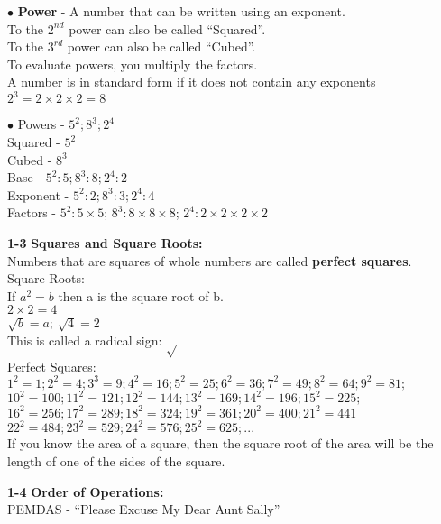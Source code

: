 \begin{enumerate*}
\begin{enumerate*}
			\item[$\bullet$]\textbf{Power} - A number that can be written using an exponent.\\
			To the $2^{nd}$ power can also be called ``Squared''.\\
			To the $3^{rd}$ power can also be called ``Cubed''.\\
			To evaluate powers, you multiply the factors.\\
			A number is in standard form if it does not contain any exponents\\
			$2^3=2\times2\times2=8$\\
			\item[$\bullet$]Powers - $5^2;8^3;2^4$\\
			Squared - $5^2$\\
			Cubed - $8^3$\\
			Base - $5^2:5;8^3:8;2^4:2$\\
			Exponent - $5^2:2;8^3:3;2^4:4$\\
			Factors - $5^2:5\times5$; $8^3:8\times8\times8$; $2^4:2\times2\times2\times2$\\
			\end{enumerate*}
			
		\item[\Large\textbf{1-3}] \Large\textbf{Squares and Square Roots:}\\
			Numbers that are squares of whole numbers are called \textbf{perfect squares}.\\
			Square Roots:\\
			If $a^2=b$ then a is the square root of b.\\
			$2\times2=4$\\
			$\sqrt{b}=a$; $\sqrt{4}=2$\\
			This is called a radical sign: $\sqrt{}$\\
			Perfect Squares:\\
			$1^2 = 1; 2^2=4; 3^3=9; 4^2=16; 5^2=25; 6^2=36; 7^2=49; 8^2=64; 9^2=81;$\\
			$10^2=100; 11^2=121; 12^2=144; 13^2=169; 14^2 = 196; 15^2=225;$\\
			$16^2=256; 17^2=289; 18^2=324; 19^2=361; 20^2=400; 21^2=441$\\
			$22^2=484; 23^2=529; 24^2=576; 25^2=625; ...$\\
			If you know the area of a square, then the square root of the area will be the length of one of the sides of the square.\\
			
		\item[\Large\textbf{1-4}] \Large\textbf{Order of Operations:}\\
			PEMDAS - ``Please Excuse My Dear Aunt Sally''\\
			

\end{enumerate*}
